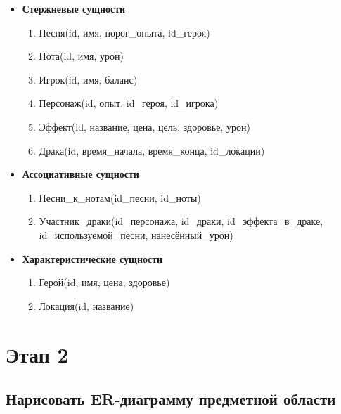 
\begin{itemize}
\item \textbf{Стержневые сущности}
\begin{enumerate}
    \item Песня(id, имя, порог\_опыта, id\_героя)
    \item Нота(id, имя, урон)
    \item Игрок(id, имя, баланс)
    \item Персонаж(id, опыт, id\_героя, id\_игрока)
    \item Эффект(id, название, цена, цель, здоровье, урон)
    \item Драка(id, время\_начала, время\_конца, id\_локации)
\end{enumerate}

\item \textbf{Ассоциативные сущности}
\begin{enumerate}
    \item Песни\_к\_нотам(id\_песни, id\_ноты)
    \item Участник\_драки(id\_персонажа, id\_драки, id\_эффекта\_в\_драке, id\_используемой\_песни, нанесённый\_урон)
\end{enumerate}

\item \textbf{Характеристические сущности}
\begin{enumerate}
    \item Герой(id, имя, цена, здоровье)
    \item Локация(id, название)
\end{enumerate}
\end{itemize}

\section*{Этап 2}


\subsection*{Нарисовать ER-диаграмму предметной области}


